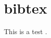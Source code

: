\documentclass[a4paper]{amsart}
\begin{document}
\section{bibtex}
This is a test \cite{doe1905}.
\end{document}
